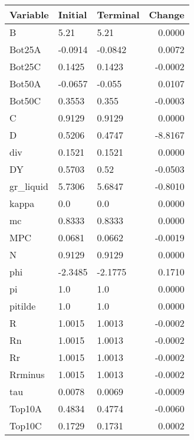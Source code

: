 \begin{table}
\centering
\label{tab:stst_comparison_slow_shock_limit_permanent}
\begin{tabular}{lllr}
\toprule
                Variable & Initial & Terminal &  Change \\
\midrule
                       B &    5.21 &     5.21 &  0.0000 \\
                  Bot25A & -0.0914 &  -0.0842 &  0.0072 \\
                  Bot25C &  0.1425 &   0.1423 & -0.0002 \\
                  Bot50A & -0.0657 &   -0.055 &  0.0107 \\
                  Bot50C &  0.3553 &    0.355 & -0.0003 \\
                       C &  0.9129 &   0.9129 &  0.0000 \\
                       D &  0.5206 &   0.4747 & -8.8167 \\
                     div &  0.1521 &   0.1521 &  0.0000 \\
                      DY &  0.5703 &     0.52 & -0.0503 \\
               gr\_liquid &  5.7306 &   5.6847 & -0.8010 \\
                   kappa &     0.0 &      0.0 &  0.0000 \\
                      mc &  0.8333 &   0.8333 &  0.0000 \\
                     MPC &  0.0681 &   0.0662 & -0.0019 \\
                       N &  0.9129 &   0.9129 &  0.0000 \\
                     phi & -2.3485 &  -2.1775 &  0.1710 \\
                      pi &     1.0 &      1.0 &  0.0000 \\
                 pitilde &     1.0 &      1.0 &  0.0000 \\
                       R &  1.0015 &   1.0013 & -0.0002 \\
                      Rn &  1.0015 &   1.0013 & -0.0002 \\
                      Rr &  1.0015 &   1.0013 & -0.0002 \\
                 Rrminus &  1.0015 &   1.0013 & -0.0002 \\
                     tau &  0.0078 &   0.0069 & -0.0009 \\
                  Top10A &  0.4834 &   0.4774 & -0.0060 \\
                  Top10C &  0.1729 &   0.1731 &  0.0002 \\

\end{tabular}
\end{table}
